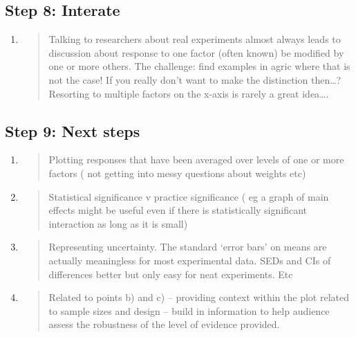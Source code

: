 \documentclass[
]{book}
\begin{document}
\hypertarget{step-8-interate}{%
\subsection{Step 8: Interate}\label{step-8-interate}}

\begin{enumerate}
\def\labelenumi{\alph{enumi}.}
\item
  \begin{quote}
  Talking to researchers about real experiments almost always leads to discussion about response to one factor (often known) be modified by one or more others. The challenge: find examples in agric where that is not the case! If you really don't want to make the distinction then\ldots? Resorting to multiple factors on the x-axis is rarely a great idea\ldots.
  \end{quote}
\end{enumerate}

\hypertarget{step-9-next-steps}{%
\subsection{Step 9: Next steps}\label{step-9-next-steps}}

\begin{enumerate}
\def\labelenumi{\alph{enumi}.}
\item
  \begin{quote}
  Plotting responses that have been averaged over levels of one or more factors ( not getting into messy questions about weights etc)
  \end{quote}
\item
  \begin{quote}
  Statistical significance v practice significance ( eg a graph of main effects might be useful even if there is statistically significant interaction as long as it is small)
  \end{quote}
\item
  \begin{quote}
  Representing uncertainty. The standard `error bars' on means are actually meaningless for most experimental data. SEDs and CIs of differences better but only easy for neat experiments. Etc
  \end{quote}
\item
  \begin{quote}
  Related to points b) and c) -- providing context within the plot related to sample sizes and design -- build in information to help audience assess the robustness of the level of evidence provided.
  \end{quote}
\end{enumerate}
\end{document}

